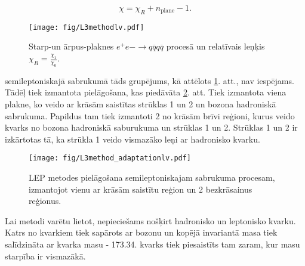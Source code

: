 \begin{equation}
  \chi=\chi_{R} + n_{\text{plane}} - 1.
\end{equation}

\begin{figure}[hbtp]
  \centering
  \texttt{[image: fig/L3methodlv.pdf]}
  \caption{Starp-\PW un ārpus-\PW plaknes $e^{+}e{-}\rightarrow q\overline{q}q\overline{q}$ procesā un relatīvais leņķis $\chi_{R}=\frac{\chi_{1}}{\chi_{0}}$.}
  \label{fig:LEP_method}
\end{figure}

 \ttbar semileptoniskajā sabrukumā tāds grupējums, kā attēlots \ref{fig:LEP_method}. att., nav iespējams. Tādēļ tiek izmantota pielāgošana, kas piedāvāta \ref{fig:LEP_method_adaptation}. att. Tiek izmantota viena plakne, ko veido ar krāsām saistītas strūklas 1 un 2 un \PW bozona hadroniskā sabrukuma. Papildus tam tiek izmantoti 2 no krāsām brīvi reģioni, kurus veido \cPqb kvarks no \PW bozona hadroniskā saburukuma un strūklas 1 un 2. Strūklas 1 un 2 ir izkārtotas tā, ka strūkla 1 veido vismazāko leņi ar hadronisko \cPqb kvarku. 

\begin{figure}[hbtp]
  \centering
  \texttt{[image: fig/L3method\_adaptationlv.pdf]}
  \caption{LEP metodes pielāgošana semileptoniskajam \ttbar sabrukuma procesam, izmantojot vienu ar krāsām saistītu reģion un 2 bezkrāsainus reģionus.}
  \label{fig:LEP_method_adaptation}
\end{figure}

Lai metodi varētu lietot, nepieciešams nošķirt hadronisko un leptonisko \cPqb kvarku. Katrs no \cPqb kvarkiem tiek sapārots ar \PW bozonu un kopējā invariantā masa tiek salīdzināta ar \cPqt kvarka masu - 173.34\GeV. \cPqb kvarks tiek piesaistīts tam zaram, kur masu starpība ir vismazākā. 

